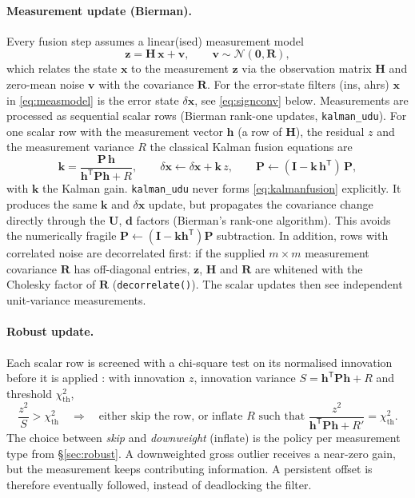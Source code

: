 \documentclass[11pt,a4paper]{article}
\newcommand{\vect}[1]{\bm{#1}}
\newcommand{\mat}[1]{\bm{#1}}
\newcommand{\T}{^{\mathsf{T}}}
\newcommand{\code}[1]{\texttt{#1}}
\begin{document}
\paragraph{Measurement update (Bierman).}
Every fusion step assumes a linear(ised) measurement model
\begin{equation}
  \vect{z} = \mat{H}\,\vect{x} + \vect{v},
  \qquad \vect{v} \sim \mathcal{N}(\vect{0}, \mat{R}),
  \label{eq:measmodel}
\end{equation}
which relates the state $\vect{x}$ to the measurement $\vect{z}$ via the
observation matrix $\mat{H}$ and zero-mean noise $\vect{v}$ with the covariance
$\mat{R}$. For the error-state filters (ins, ahrs) $\vect{x}$ in
\eqref{eq:measmodel} is the error state $\delta\vect{x}$, see
\eqref{eq:signconv} below. Measurements are processed as sequential
scalar rows (Bierman rank-one updates, \code{kalman\_\allowbreak{}udu}). For one
scalar row with the measurement vector $\vect{h}$ (a row of $\mat{H}$), the
residual $z$ and the measurement variance $R$ the classical Kalman fusion
equations are
\begin{equation}
  \vect{k} = \frac{\mat{P}\,\vect{h}}{\vect{h}\T\mat{P}\vect{h} + R},
  \qquad
  \delta\vect{x} \leftarrow \delta\vect{x} + \vect{k}\,z,
  \qquad
  \mat{P} \leftarrow (\mat{I} - \vect{k}\,\vect{h}\T)\,\mat{P},
  \label{eq:kalmanfusion}
\end{equation}
with $\vect{k}$ the Kalman gain. \code{kalman\_\allowbreak{}udu} never forms
\eqref{eq:kalmanfusion} explicitly. It produces the same $\vect{k}$ and
$\delta\vect{x}$ update, but propagates the covariance change directly
through the $\mat{U}$, $\vect{d}$ factors (Bierman's rank-one algorithm).
This avoids the numerically fragile
$\mat{P} \leftarrow (\mat{I}-\vect{k}\vect{h}\T)\mat{P}$ subtraction.
In addition, rows with correlated noise are decorrelated
first: if the supplied $m\times m$ measurement covariance $\mat{R}$ has
off-diagonal entries, $\vect{z}$, $\mat{H}$ and $\mat{R}$ are whitened
with the Cholesky factor of $\mat{R}$ (\code{decorrelate()}). The
scalar updates then see independent unit-variance measurements.

\paragraph{Robust update.}
\label{sec:robust-udu}
Each scalar row is screened with a chi-square test on its normalised
innovation before it is applied \cite{chang2014}: with innovation $z$,
innovation variance $S = \mat{h}\T\mat{P}\mat{h} + R$ and threshold
$\chi^2_{\text{th}}$,
\begin{equation}
  \frac{z^2}{S} > \chi^2_{\text{th}}
  \quad\Longrightarrow\quad
  \text{either skip the row, or inflate } R \text{ such that }
  \frac{z^2}{\mat{h}\T\mat{P}\mat{h} + R'} = \chi^2_{\text{th}} .
\end{equation}
The choice between \emph{skip} and \emph{downweight} (inflate) is the
policy per measurement type from \S\ref{sec:robust}. A downweighted gross
outlier receives a near-zero gain, but the measurement keeps
contributing information. A persistent offset is therefore eventually followed,
instead of deadlocking the filter.
\end{document}
